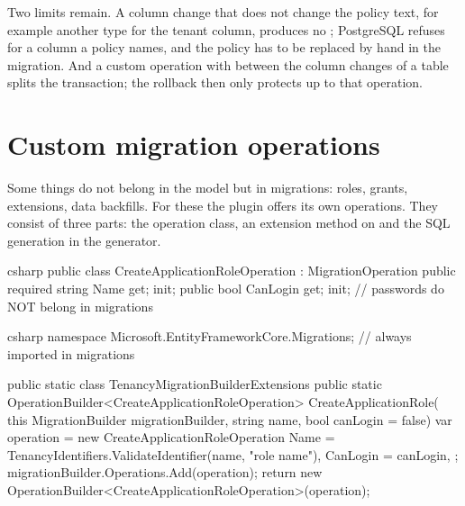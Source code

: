 Two limits remain. A column change that does not change the policy text, for example another
type for the tenant column, produces no ;
PostgreSQL refuses  for a column a policy names, and the policy
has to be replaced by hand in the migration. And a custom operation with
 between the column changes of a table splits the
transaction; the rollback then only protects up to that operation.

\chapter{Custom migration operations}\label{ch:custom-migration-operations}

Some things do not belong in the model but in migrations: roles, grants, extensions, data
backfills. For these the plugin offers its own operations. They consist of three parts: the
operation class, an extension method on  and the SQL
generation in the generator.

\begin{sourcecode}{csharp}
public class CreateApplicationRoleOperation : MigrationOperation
{
    public required string Name { get; init; }
    public bool CanLogin { get; init; }       // passwords do NOT belong in migrations
}
\end{sourcecode}

\begin{sourcecode}{csharp}
namespace Microsoft.EntityFrameworkCore.Migrations;      // always imported in migrations

public static class TenancyMigrationBuilderExtensions
{
    public static OperationBuilder<CreateApplicationRoleOperation> CreateApplicationRole(
        this MigrationBuilder migrationBuilder, string name, bool canLogin = false)
    {
        var operation = new CreateApplicationRoleOperation
        {
            Name = TenancyIdentifiers.ValidateIdentifier(name, "role name"),
            CanLogin = canLogin,
        };
        migrationBuilder.Operations.Add(operation);
        return new OperationBuilder<CreateApplicationRoleOperation>(operation);
    }
}
\end{sourcecode}

